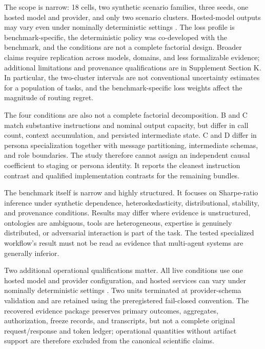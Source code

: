 The scope is narrow: 18 cells, two synthetic scenario families, three seeds,
one hosted model and provider, and only two scenario clusters.  Hosted-model
outputs may vary even under nominally deterministic settings
\citep{AtilEtAl2025Nondeterminism}.  The loss profile is benchmark-specific,
the deterministic policy was co-developed with the benchmark, and the
conditions are not a complete factorial design.  Broader claims require
replication across models, domains, and less formalizable evidence; additional
limitations and provenance qualifications are in
Supplement Section K.  In particular, the two-cluster intervals are not
conventional uncertainty estimates for a population of tasks, and the
benchmark-specific loss weights affect the magnitude of routing regret.

The four conditions are also not a complete factorial decomposition.  B and C
match substantive instructions and nominal output capacity, but differ in
call count, context accumulation, and persisted intermediate state.  C and D
differ in persona specialization together with message partitioning,
intermediate schemas, and role boundaries.  The study therefore cannot assign
an independent causal coefficient to staging or persona identity.  It reports
the cleanest instruction contrast and qualified implementation contrasts for
the remaining bundles.

The benchmark itself is narrow and highly structured.  It focuses on
Sharpe-ratio inference under synthetic dependence, heteroskedasticity,
distributional, stability, and provenance conditions.  Results may differ
where evidence is unstructured, ontologies are ambiguous, tools are
heterogeneous, expertise is genuinely distributed, or adversarial interaction
is part of the task.  The tested specialized workflow's result must not be
read as evidence that multi-agent systems are generally inferior.

Two additional operational qualifications matter.  All live conditions use
one hosted model and provider configuration, and hosted services can vary
under nominally deterministic settings
\citep{AtilEtAl2025Nondeterminism}.  Two units terminated at provider-schema
validation and are retained using the preregistered fail-closed convention.
The recovered evidence package preserves primary outcomes, aggregates,
authorization, freeze records, and transcripts, but not a complete original
request/response and token ledger; operational quantities without artifact
support are therefore excluded from the canonical scientific claims.

